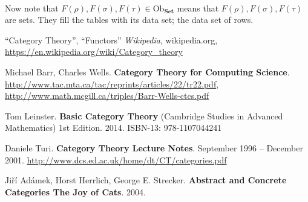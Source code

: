 \documentclass[twoside,landscape,10pt]{amsart}
\theoremstyle{plain}
\theoremstyle{definition}
\theoremstyle{remark}
\begin{document}
\begin{multicols*}{2}
 \quad \quad \quad \,   

Now note that $F(\rho), F(\sigma), F(\tau) \in \text{Ob}_{\mathbf{\text{Set}}}$ means that $F(\rho),F(\sigma),F(\tau)$ are sets.  They fill the tables with its data set; the data set of rows.  



\end{multicols*}



\begin{thebibliography}{9}

``Category Theory'', ``Functors'' \emph{Wikipedia}, wikipedia.org, \url{https://en.wikipedia.org/wiki/Category_theory}

Michael Barr, Charles Wells.  \textbf{Category Theory for Computing Science}.  \url{http://www.tac.mta.ca/tac/reprints/articles/22/tr22.pdf}, \url{http://www.math.mcgill.ca/triples/Barr-Wells-ctcs.pdf}

Tom Leinster.  \textbf{Basic Category Theory} (Cambridge Studies in Advanced Mathematics) 1st Edition.  2014.  ISBN-13: 978-1107044241


Daniele Turi. \textbf{Category Theory Lecture Notes}.  September 1996 – December 2001.  \url{http://www.dcs.ed.ac.uk/home/dt/CT/categories.pdf}

Ji\v{r}\'{i} Ad\'{a}mek, Horst Herrlich, George E. Strecker.   \textbf{Abstract and Concrete Categories The Joy of Cats}. 2004.   

\end{thebibliography}
\end{document}
